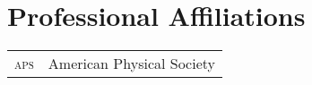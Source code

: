 \documentclass[final,oneside,10pt]{memoir}
\begin{document}
\section*{Professional Affiliations}
\newcommand{\affiliation}[2]{\textsc{#1} & #2\\}
\begin{tabularx}{\linewidth}{R{0.5in}X}
\affiliation{aps}{American Physical Society}
\end{tabularx}
\end{document}
